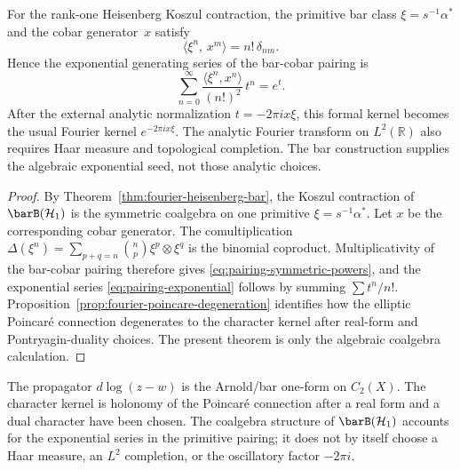 \begin{theorem}
\label{thm:fourier-recovery}
For the rank-one Heisenberg Koszul contraction, the primitive
bar class $\xi=s^{-1}\alpha^*$ and the cobar generator~$x$ satisfy
\begin{equation}\label{eq:pairing-symmetric-powers}
\bigl\langle \xi^n,\,x^m\bigr\rangle=n!\,\delta_{nm}.
\end{equation}
Hence the exponential generating series of the bar-cobar pairing is
\begin{equation}\label{eq:pairing-exponential}
\sum_{n=0}^{\infty}
 \frac{\langle\xi^n,x^n\rangle}{(n!)^2}\,t^n=e^t.
\end{equation}
After the external analytic normalization $t=-2\pi i x\xi$, this
formal kernel becomes the usual Fourier kernel
$e^{-2\pi i x\xi}$. The analytic Fourier transform on
$L^2(\mathbb R)$ also requires Haar measure and topological
completion. The bar construction supplies the algebraic exponential
seed, not those analytic choices.
\end{theorem}

\begin{proof}
By Theorem~\ref{thm:fourier-heisenberg-bar}, the Koszul contraction of
$\barB(\mathcal{H}_1)$ is the symmetric coalgebra on one primitive
$\xi=s^{-1}\alpha^*$. Let $x$ be the corresponding cobar generator.
The comultiplication
$\Delta(\xi^n) = \sum_{p+q=n}\binom{n}{p}\xi^p \otimes \xi^q$
is the binomial coproduct. Multiplicativity of the bar-cobar pairing
therefore gives \eqref{eq:pairing-symmetric-powers}, and the
exponential series \eqref{eq:pairing-exponential} follows by summing
\(\sum t^n/n!\). Proposition~\ref{prop:fourier-poincare-degeneration}
identifies how the elliptic Poincar\'e connection degenerates to the
character kernel after real-form and Pontryagin-duality choices. The
present theorem is only the algebraic coalgebra calculation.
\end{proof}

\begin{remark}\label{rem:propagator-vs-kernel}
The propagator $d\log(z-w)$ is the Arnold/bar one-form on $C_2(X)$.
The character kernel is holonomy of the Poincar\'e connection after a
real form and a dual character have been chosen. The coalgebra
structure of $\barB(\mathcal{H}_1)$ accounts for the exponential
series in the primitive pairing; it does not by itself choose a Haar
measure, an $L^2$ completion, or the oscillatory factor $-2\pi i$.
\end{remark}

